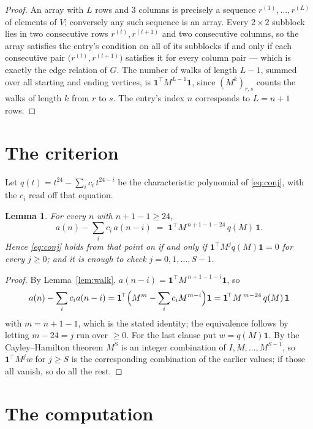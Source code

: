 \documentclass[11pt,a4paper]{article}
\theoremstyle{plain}
\newtheorem{lemma}[theorem]{Lemma}
\theoremstyle{definition}
\begin{document}
\begin{proof}
An array with $L$ rows and $3$ columns is precisely a sequence
$r^{(1)},\dots,r^{(L)}$ of elements of $V$; conversely any such sequence is an array.
Every $2\times2$ subblock lies in two consecutive rows $r^{(t)},r^{(t+1)}$ and two
consecutive columns, so the array satisfies the entry's condition on all of its subblocks
if and only if each consecutive pair $\bigl(r^{(t)},r^{(t+1)}\bigr)$ satisfies it for
every column pair --- which is exactly the edge relation of $G$. The number of walks of
length $L-1$, summed over all starting and ending vertices, is
$\mathbf{1}^{\!\top}M^{L-1}\mathbf{1}$, since $(M^{k})_{r,s}$ counts the walks of
length $k$ from $r$ to $s$. The entry's index $n$ corresponds to $L=n+1$ rows.
\end{proof}

\section{The criterion}

Let $q(t)=t^{24}-\sum_i c_i\,t^{24-i}$ be the characteristic polynomial of
\eqref{eq:conj}, with the $c_i$ read off that equation.

\begin{lemma}\label{lem:crit}
For every $n$ with $n+1-1\ge24$,
\[
a(n)-\sum_i c_i\,a(n-i)\;=\;\mathbf{1}^{\!\top}M^{\,n+1-1-24}\,q(M)\,\mathbf{1} .
\]
Hence \eqref{eq:conj} holds from that point on if and only if
$\mathbf{1}^{\!\top}M^{j}q(M)\mathbf{1}=0$ for every $j\ge0$; and it is enough to check
$j=0,1,\dots,S-1$.
\end{lemma}

\begin{proof}
By Lemma~\ref{lem:walk}, $a(n-i)=\mathbf{1}^{\!\top}M^{\,n+1-1-i}\mathbf{1}$, so
\[
a(n)-\sum_i c_i a(n-i)
=\mathbf{1}^{\!\top}\Bigl(M^{m}-\sum_i c_i M^{m-i}\Bigr)\mathbf{1}
=\mathbf{1}^{\!\top}M^{\,m-24}\,q(M)\,\mathbf{1}
\]
with $m=n+1-1$, which is the stated identity; the equivalence follows by letting
$m-24=j$ run over $\ge0$. For the last clause put $w=q(M)\mathbf{1}$. By the
Cayley--Hamilton theorem $M^{S}$ is an integer combination of $I,M,\dots,M^{S-1}$, so
$\mathbf{1}^{\!\top}M^{j}w$ for $j\ge S$ is the corresponding combination of the earlier
values; if those all vanish, so do all the rest.
\end{proof}

\section{The computation}
\end{document}
